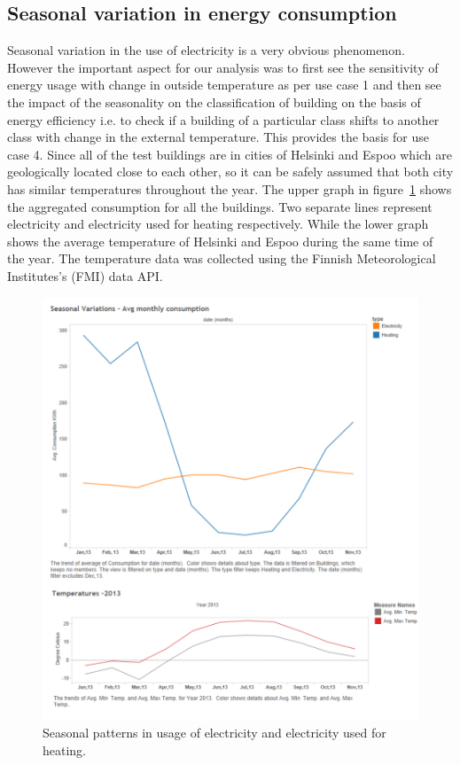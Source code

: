\subsection{Seasonal variation in energy consumption}
Seasonal variation in the use of electricity is a very obvious phenomenon. However the important aspect for our analysis was to first see the sensitivity of energy usage with change in outside temperature as per use case 1 and then see the impact of the seasonality on the classification of building on the basis of energy efficiency i.e. to check if a building of a particular class shifts to another class with change in the external temperature. This provides the basis for use case 4. Since all of the test buildings are in cities of Helsinki and Espoo which are geologically located close to each other, so it can be safely assumed that both city has similar temperatures throughout the year. The upper graph in figure~\ref{fig:season} shows the aggregated consumption for all the buildings. Two separate lines represent electricity and electricity used for heating respectively. While the lower graph shows the average temperature of Helsinki and Espoo during the same time of the year. The temperature data was collected using the Finnish Meteorological Institutes's (FMI) data API.       
 
\begin{figure}[!ht]
    \begin{center}
      \includegraphics[scale = 0.7]{images/season.pdf}
      \caption{Seasonal patterns in usage of electricity and electricity used for heating.}
      \label{fig:season}
    \end{center}
  \end{figure} 

